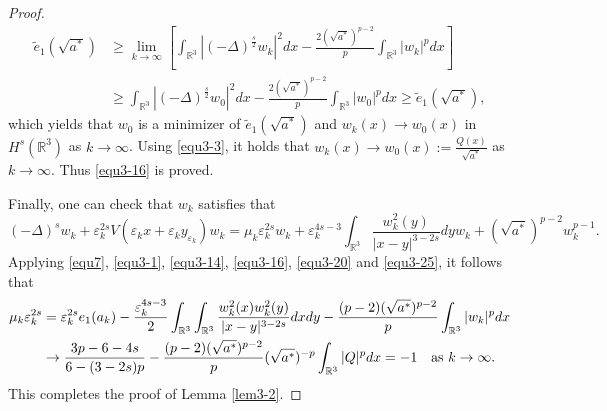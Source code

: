 \documentclass[reqno, 11pt]{amsart} %
\numberwithin{equation}{section}
\begin{document}
\begin{proof}
		\begin{equation*}
			\begin{split}
				\tilde{e}_{1}(\sqrt{a^{\ast}})&\geq\lim_{k\rightarrow\infty}\left[\int_{\mathbb{R}^{3}}|(-\Delta)^{\frac{s}{2}} w_{k}|^{2}dx-\frac{2(\sqrt{a^{\ast}})^{p-2}}{p}\int_{\mathbb{R}^{3}}|w_{k}|^{p}dx \right]\\
				&\geq\int_{\mathbb{R}^{3}}|(-\Delta)^{\frac{s}{2}} w_{0}|^{2}dx-\frac{2(\sqrt{a^{\ast}})^{p-2}}{p}\int_{\mathbb{R}^{3}}|w_{0}|^{p}dx\geq\tilde{e}_{1}(\sqrt{a^{\ast}}),
			\end{split}
		\end{equation*}
		which yields that $w_{0}$ is a minimizer of $\tilde{e}_{1}(\sqrt{a^{\ast}})$ and $w_{k}(x)\rightarrow w_{0}(x)$ in $H^{s}(\mathbb{R}^{3})$ as $k\rightarrow\infty$. Using \eqref{equ3-3}, it holds that $w_{k}(x)\rightarrow w_{0}(x):=\frac{Q(x)}{\sqrt{a^{\ast}}}$ as $k\rightarrow\infty$. Thus \eqref{equ3-16} is proved.
		
		Finally, one can check that $w_{k}$ satisfies that
		\begin{equation}\label{equ3-25}
			(-\Delta)^{s} w_{k}+\varepsilon_{k}^{2s}V(\varepsilon_{k}x+\varepsilon_{k}y_{\varepsilon_{k}})w_{k}=\mu_{k}\varepsilon_{k}^{2s}w_{k}+\varepsilon_{k}^{4s-3}\int_{\mathbb{R}^{3}}\frac{w^{2}_{k}(y)}{|x-y|^{3-2s}}dyw_{k}+(\sqrt{a^{\ast}})^{p-2}w_{k}^{p-1}.
		\end{equation}
		Applying \eqref{equ7}, \eqref{equ3-1}, \eqref{equ3-14}, \eqref{equ3-16}, \eqref{equ3-20} and \eqref{equ3-25}, it follows that
		\begin{equation}\label{equ3-26}
			\begin{split}
				\mu_{k}\varepsilon_{k}^{2s}&=\varepsilon_{k}^{2s}e_{1}(a_{k})-\frac{\varepsilon_{k}^{4s-3}}{2}\int_{\mathbb{R}^{3}}\int_{\mathbb{R}^{3}}\frac{w_{k}^{2}(x)w_{k}^{2}(y)}{|x-y|^{3-2s}}dxdy-\frac{(p-2)(\sqrt{a^{\ast}})^{p-2}}{p}\int_{\mathbb{R}^{3}}|w_{k}|^{p}dx\\
				&\rightarrow\frac{3p-6-4s}{6-(3-2s)p}-\frac{(p-2)(\sqrt{a^{\ast}})^{p-2}}{p}(\sqrt{a^{\ast}})^{-p}\int_{\mathbb{R}^{3}}|Q|^{p}dx=-1\quad \hbox{as $k\rightarrow\infty$}.
			\end{split}
		\end{equation}
		This completes the proof of Lemma \ref{lem3-2}.
	\end{proof}
	
\end{document}
